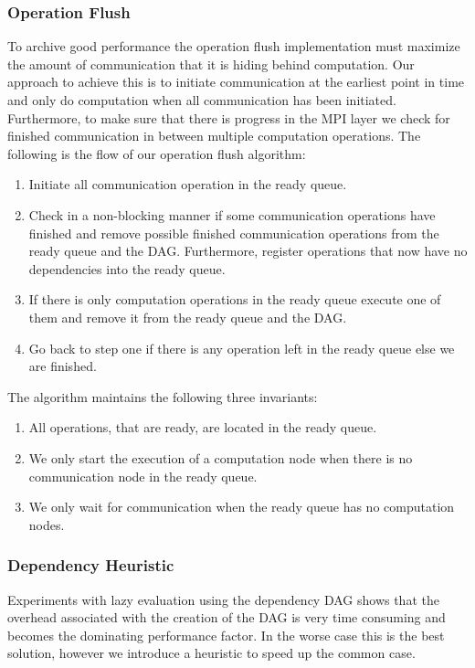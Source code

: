 \documentclass[preprint]{../PGAS10/sigplanconf}
\begin{document}
\subsubsection{Operation Flush}
To archive good performance the operation flush implementation must maximize the amount of communication that it is hiding behind computation. Our approach to achieve this is to initiate communication at the earliest point in time and only do computation when all communication has been initiated. Furthermore, to make sure that there is progress in the MPI layer we check for finished communication in between multiple computation operations. The following is the flow of our operation flush algorithm:
\begin{enumerate}
\item Initiate all communication operation in the ready queue.
\item Check in a non-blocking manner if some communication operations have finished and remove possible finished communication operations from the ready queue and the DAG. Furthermore, register operations that now have no dependencies into the ready queue.
\item If there is only computation operations in the ready queue execute one of them and remove it from the ready queue and the DAG.
\item Go back to step one if there is any operation left in the ready queue else we are finished.
\end{enumerate}
The algorithm maintains the following three invariants:
\begin{enumerate}
\item All operations, that are ready, are located in the ready queue.
\item We only start the execution of a computation node when there is no communication node in the ready queue.
\item We only wait for communication when the ready queue has no computation nodes.
\end{enumerate}



\subsubsection{Dependency Heuristic}
Experiments with lazy evaluation using the dependency DAG shows that the overhead associated with the creation of the DAG is very time consuming and becomes the dominating performance factor. In the worse case this is the best solution, however we introduce a heuristic to speed up the common case. 
\end{document}
